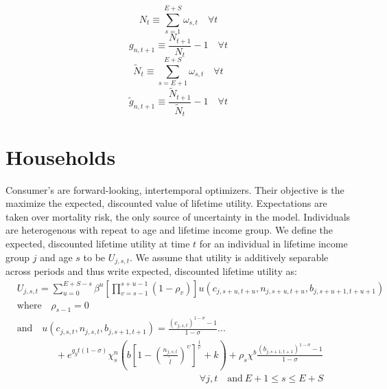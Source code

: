     \begin{equation}\label{EqPopDef}
      N_t\equiv\sum_{s=1}^{E+S} \omega_{s,t} \quad\forall t
    \end{equation}
    \begin{equation}\label{EqPopGrowth}
      g_{n,t+1} \equiv \frac{N_{t+1}}{N_t} - 1 \quad\forall t
    \end{equation}
    \begin{equation}\label{EqPopWkDef}
      \tilde{N}_t\equiv\sum_{s=E+1}^{E+S} \omega_{s,t} \quad\forall t
    \end{equation}
    \begin{equation}\label{EqPopWkGrowth}
      \tilde{g}_{n,t+1} \equiv \frac{\tilde{N}_{t+1}}{\tilde{N}_t} - 1 \quad\forall t
    \end{equation}


  \section{Households}
  Consumer's are forward-looking, intertemporal optimizers.  Their objective is the maximize the expected, discounted value of lifetime utility.  Expectations are taken over mortality risk, the only source of uncertainty in the model.  Individuals are heterogenous with repeat to age and lifetime income group.  We define the expected, discounted lifetime utility at time $t$ for an individual in lifetime income group $j$ and age $s$ to be $U_{j,s,t}$.  We assume that utility is additively separable across periods and thus write expected, discounted lifetime utility as:
    \begin{equation}\label{EqUtilMax}
      \begin{split}
        &U_{j,s,t} = \sum_{u=0}^{E+S-s}\beta^u\left[\prod_{v=s-1}^{s+u-1}(1-\rho_v)\right] u\left(c_{j,s+u,t+u},n_{j,s+u,t+u},b_{j,s+u+1,t+u+1}\right) \\
        &\text{where}\quad \rho_{s-1}=0 \\
        &\text{and} \quad u\left(c_{j,s,t},n_{j,s,t},b_{j,s+1,t+1}\right) = \frac{\left(c_{j,s,t}\right)^{1-\sigma} - 1}{1-\sigma} ... \\
        &\qquad\qquad + e^{g_y t(1-\sigma)}\chi^n_s\left(b\left[1 - \left(\frac{n_{j,s,t}}{\tilde{l}}\right)^\upsilon\right]^\frac{1}{\upsilon} + k\right) + \rho_s\chi^b\frac{\left(b_{j,s+1,t+1}\right)^{1-\sigma} - 1}{1-\sigma} \\
        &\quad\quad\quad\quad\quad\quad\quad\quad\quad\quad\quad\quad\quad\quad\quad\quad\quad\quad\quad\forall j,t\quad\text{and}\:E+1\leq s\leq E+S
      \end{split}
    \end{equation}

